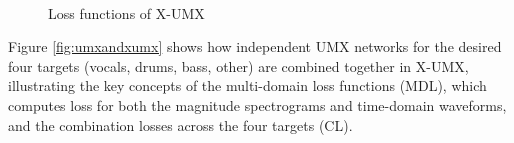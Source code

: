 \documentclass[report.tex]{subfiles}
\begin{document}
\begin{figure}[ht]
	\centering
	\\
	\caption{Loss functions of X-UMX \parencite[2]{xumx}}
	\label{fig:xumxlosses}
\end{figure}

Figure \ref{fig:umxandxumx} shows how independent UMX networks for the desired four targets (vocals, drums, bass, other) are combined together in X-UMX, illustrating the key concepts of the multi-domain loss functions (MDL), which computes loss for both the magnitude spectrograms and time-domain waveforms, and the combination losses across the four targets (CL).
\end{document}
